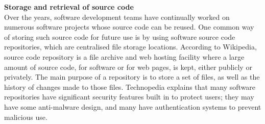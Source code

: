 \documentclass[a4paper]{article}
\begin{document}
{\bf Storage and retrieval of source code} \\
Over the years, software development teams have continually worked on numerous software projects whose source code can be reused. One common way of storing such source code for future use is by using software source code repositories, which are centralised file storage locations. According to Wikipedia, source code repository is a file archive and web hosting facility where a large amount of source code, for software or for web pages, is kept, either publicly or privately. The main purpose of a repository is to store a set of files, as well as the history of changes made to those files. Technopedia explains that many software repositories have significant security features built in to protect users; they may have some anti-malware design, and many have authentication systems to prevent malicious use. \\
\end{document}
